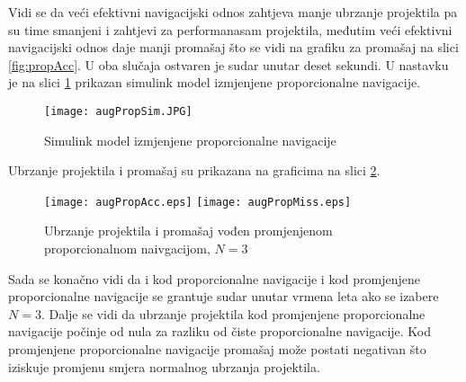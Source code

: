 Vidi se da veći efektivni navigacijski odnos zahtjeva manje ubrzanje projektila pa su time 
smanjeni i zahtjevi za performanasam projektila, međutim veći efektivni navigacijski odnos 
daje manji promašaj što se vidi na grafiku za promašaj na slici \ref{fig:propAcc}. 
U oba slučaja ostvaren je sudar unutar deset sekundi. U nastavku je na slici \ref{fig:simAugProp} prikazan 
simulink model izmjenjene proporcionalne navigacije.
\begin{figure}[!ht]
    \centering
    \texttt{[image: augPropSim.JPG]}
    \caption{Simulink model izmjenjene proporcionalne navigacije}
    \label{fig:simAugProp}
\end{figure}
Ubrzanje projektila i promašaj su prikazana na graficima na slici \ref{fig:augPropGraf}.
\begin{figure}[!ht]
    \centering
    \texttt{[image: augPropAcc.eps]}
    \texttt{[image: augPropMiss.eps]}
    \caption{Ubrzanje projektila i promašaj vođen promjenjenom proporcionalnom naivgacijom, $N=3$}
    \label{fig:augPropGraf}
\end{figure}
Sada se konačno vidi da i kod proporcionalne navigacije i kod promjenjene proporcionalne navigacije 
se grantuje sudar unutar vrmena leta ako se izabere $N=3$. Dalje se vidi da 
ubrzanje projektila kod promjenjene proporcionalne navigacije počinje od nula za razliku od čiste proporcionalne 
navigacije. Kod promjenjene proporcionalne navigacije promašaj može postati negativan što iziskuje 
promjenu smjera normalnog ubrzanja projektila. 
